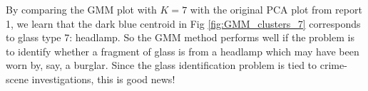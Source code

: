 By comparing the GMM plot with $K=7$ with the original PCA plot from report 1, we learn that the dark blue centroid in Fig \ref{fig:GMM_clusters_7}  corresponds to glass type 7: headlamp. So the GMM method performs well if the problem is to identify whether a fragment of glass is from a headlamp which may have been worn by, say, a burglar. Since the glass identification problem is tied to crime-scene investigations, this is good news!

